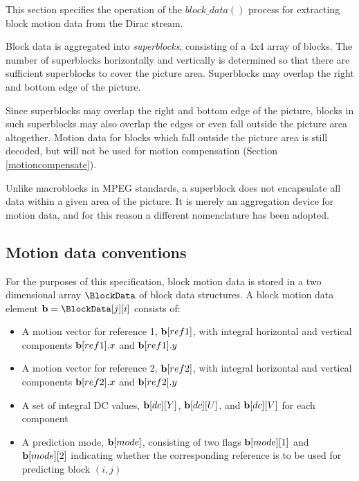 
\label{motiondec}

This section specifies the operation of the $block\_data()$ process for extracting
block motion data from the Dirac stream. 

Block data is aggregated into {\em superblocks}, consisting of a 4x4 array of blocks. The number 
of superblocks horizontally and vertically is determined so that there are sufficient superblocks
to cover the picture area. Superblocks may overlap the right and bottom edge of the picture.

\begin{informative}
Since superblocks may overlap the right and bottom edge of the picture, blocks in such superblocks
may also overlap the edges or even fall outside the picture area altogether. Motion data for 
blocks which fall outside the picture area is still decoded, but will not be used for motion compensation 
(Section \ref{motioncompensate}). 

Unlike macroblocks in MPEG standards, a superblock does not encapsulate all data within a 
given area of the picture. It is merely an aggregation device for motion data, and for this reason
a different nomenclature has been adopted.
\end{informative}

\subsection{Motion data conventions}

\label{motionconventions}

For the purposes of this specification, block motion data is stored in a two dimensional array 
$\BlockData$ of block data structures. A block motion data element ${\bf b}=\BlockData[j][i]$ consists of:

\begin{itemize}
\item A motion vector for reference 1, ${\bf b}[ref1]$, with integral horizontal and vertical components 
${\bf b}[ref1].x$ and ${\bf b}[ref1].y$
\item A motion vector for reference 2, ${\bf b}[ref2]$, with integral horizontal and vertical components 
${\bf b}[ref2].x$ and ${\bf b}[ref2].y$
\item A set of integral DC values, ${\bf b}[dc][Y]$, ${\bf b}[dc][U]$, and ${\bf b}[dc][V]$ for each component
\item A prediction mode, ${\bf b}[mode]$, consisting of two flags ${\bf b}[mode][1]$ and ${\bf b}[mode][2]$ 
indicating whether the corresponding reference is to be used for predicting block $(i,j)$
\end{itemize}

